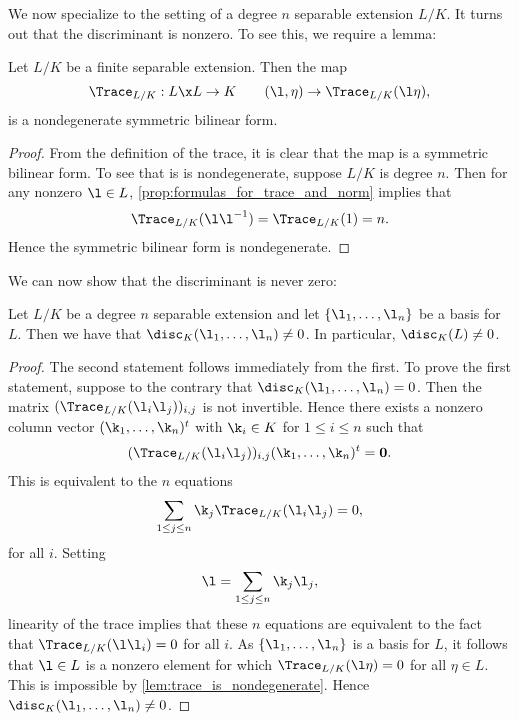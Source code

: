     We now specialize to the setting of a degree $n$ separable extension $L/K$. It turns out that the discriminant is nonzero. To see this, we require a lemma:

    \begin{lemma}\label{lem:trace_is_nondegenerate}
      Let $L/K$ be a finite separable extension. Then the map
      \[
        \Trace_{L/K}:L \x L \to K \qquad (\l,\eta) \to \Trace_{L/K}(\l\eta),
      \]
      is a nondegenerate symmetric bilinear form.
    \end{lemma}
    \begin{proof}
      From the definition of the trace, it is clear that the map is a symmetric bilinear form. To see that is is nondegenerate, suppose $L/K$ is degree $n$. Then for any nonzero $\l \in L$, \cref{prop:formulas_for_trace_and_norm} implies that
      \[
        \Trace_{L/K}(\l\l^{-1}) = \Trace_{L/K}(1) = n.
      \]
      Hence the symmetric bilinear form is nondegenerate.
    \end{proof}

    We can now show that the discriminant is never zero:

    \begin{proposition}\label{prop:discriminant_not_zero}
      Let $L/K$ be a degree $n$ separable extension and let $\{\l_{1},\ldots,\l_{n}\}$ be a basis for $L$. Then we have that $\disc_{K}(\l_{1},\ldots,\l_{n}) \neq 0$. In particular, $\disc_{K}(L) \neq 0$.
    \end{proposition}
    \begin{proof}
      The second statement follows immediately from the first. To prove the first statement, suppose to the contrary that $\disc_{K}(\l_{1},\ldots,\l_{n}) = 0$. Then the matrix $(\Trace_{L/K}(\l_{i}\l_{j}))_{i,j}$ is not invertible. Hence there exists a nonzero column vector $(\k_{1},\ldots,\k_{n})^{t}$ with $\k_{i} \in K$ for $1 \le i \le n$ such that
      \[
        (\Trace_{L/K}(\l_{i}\l_{j}))_{i,j}(\k_{1},\ldots,\k_{n})^{t} = \mathbf{0}.
      \]
      This is equivalent to the $n$ equations
      \[
        \sum_{1 \le j \le n}\k_{j}\Trace_{L/K}(\l_{i}\l_{j}) = 0,
      \]
      for all $i$. Setting
      \[
        \l = \sum_{1 \le j \le n}\k_{j}\l_{j},
      \]
      linearity of the trace implies that these $n$ equations are equivalent to the fact that $\Trace_{L/K}(\l\l_{i}) = 0$ for all $i$. As $\{\l_{1},\ldots,\l_{n}\}$ is a basis for $L$, it follows that $\l \in L$ is a nonzero element for which $\Trace_{L/K}(\l\eta) = 0$ for all $\eta \in L$. This is impossible by \cref{lem:trace_is_nondegenerate}. Hence $\disc_{K}(\l_{1},\ldots,\l_{n}) \neq 0$.
    \end{proof}

